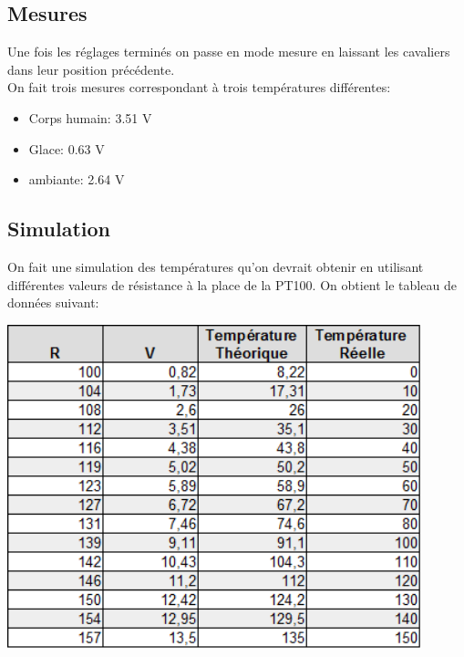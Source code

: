 \documentclass[a4paper,12pt]{article}
\begin{document}
    \subsection{Mesures}
      \par Une fois les réglages terminés on passe en mode mesure en laissant les cavaliers dans leur position précédente.\\
      On fait trois mesures correspondant à trois températures différentes:
      \begin{itemize}
        \item Corps humain: 3.51 V
        \item Glace: 0.63 V
        \item ambiante: 2.64 V
      \end{itemize}

    \subsection{Simulation}
      \par On fait une simulation des températures qu'on devrait obtenir en utilisant différentes valeurs de résistance à la place de la PT100.
			On obtient le tableau de données suivant:
			\begin{center}
				\includegraphics[width=12cm]{../Images/TabPT100.png}
			\end{center}
\end{document}
